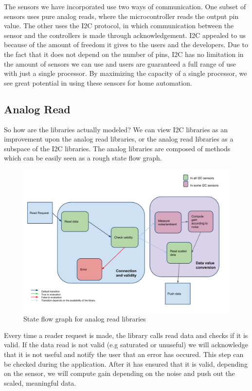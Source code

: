 \documentclass[10pt,twocolumn]{article}
\begin{document}
 The sensors we have incorporated use two ways of communication. One subset of sensors uses pure analog reads, where the microcontroller reads the output pin value. The other uses the I2C protocol, in which communication between the sensor and the controllers is made through acknowledgement. I2C appealed to us because of the amount of freedom it gives to the users and the developers. Due to the fact that it does not depend on the number of pins, I2C has no limitation in the amount of sensors we can use and users are guaranteed a full range of use with just a single processor. By maximizing the capacity of a single processor, we see great potential in using these sensors for home automation.
 \subsection*{Analog Read}
 So how are the libraries actually modeled? We can view I2C libraries as an improvement upon the analog read libraries, or the analog read libraries as a subspace of the I2C libraries. The analog libraries are composed of methods which can be easily seen as a rough state flow graph. 
 \begin{figure}[h]
  \centering
    \includegraphics[scale=0.4]{analogreadsm.png}
  \caption{State flow graph for analog read libraries}
  \label{fig:analogread}
\end{figure}
Every time a reader request is made, the library calls read data and checks if it is valid. If the data read is not valid (e.g saturated or unuseful) we will acknowledge that it is not useful and notify the user that an error has occured. This step can be checked during the application. After it has ensured that it is valid, depending on the sensor, we will compute gain depending on the noise and push out the scaled, meaningful data. 
\end{document}

